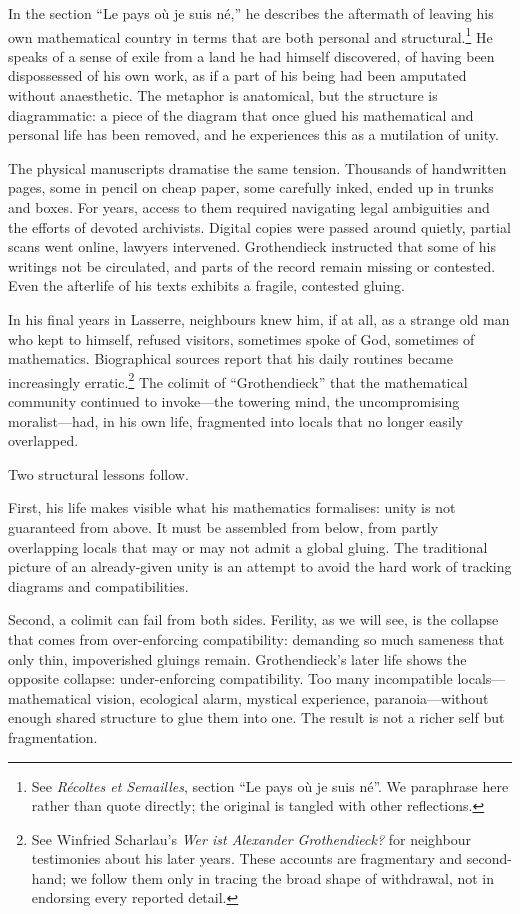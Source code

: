 \documentclass[12pt,a4paper]{article}
\begin{document}
In the section ``Le pays o\`u je suis n\'e,'' he describes the aftermath of leaving his own mathematical country in terms that are both personal and structural.\footnote{See \emph{R\'ecoltes et Semailles}, section ``Le pays o\`u je suis n\'e''. We paraphrase here rather than quote directly; the original is tangled with other reflections.} He speaks of a sense of exile from a land he had himself discovered, of having been dispossessed of his own work, as if a part of his being had been amputated without anaesthetic. The metaphor is anatomical, but the structure is diagrammatic: a piece of the diagram that once glued his mathematical and personal life has been removed, and he experiences this as a mutilation of unity.

The physical manuscripts dramatise the same tension. Thousands of handwritten pages, some in pencil on cheap paper, some carefully inked, ended up in trunks and boxes. For years, access to them required navigating legal ambiguities and the efforts of devoted archivists. Digital copies were passed around quietly, partial scans went online, lawyers intervened. Grothendieck instructed that some of his writings not be circulated, and parts of the record remain missing or contested. Even the afterlife of his texts exhibits a fragile, contested gluing.

In his final years in Lasserre, neighbours knew him, if at all, as a strange old man who kept to himself, refused visitors, sometimes spoke of God, sometimes of mathematics. Biographical sources report that his daily routines became increasingly erratic.\footnote{See Winfried Scharlau's \emph{Wer ist Alexander Grothendieck?} for neighbour testimonies about his later years. These accounts are fragmentary and second-hand; we follow them only in tracing the broad shape of withdrawal, not in endorsing every reported detail.} The colimit of ``Grothendieck'' that the mathematical community continued to invoke---the towering mind, the uncompromising moralist---had, in his own life, fragmented into locals that no longer easily overlapped.

Two structural lessons follow.

First, his life makes visible what his mathematics formalises: unity is not guaranteed from above. It must be assembled from below, from partly overlapping locals that may or may not admit a global gluing. The traditional picture of an already-given unity is an attempt to avoid the hard work of tracking diagrams and compatibilities.

Second, a colimit can fail from both sides. Ferility, as we will see, is the collapse that comes from over-enforcing compatibility: demanding so much sameness that only thin, impoverished gluings remain. Grothendieck's later life shows the opposite collapse: under-enforcing compatibility. Too many incompatible locals---mathematical vision, ecological alarm, mystical experience, paranoia---without enough shared structure to glue them into one. The result is not a richer self but fragmentation.
\end{document}
